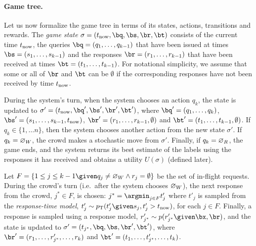 \paragraph{Game tree.}
Let us now formalize the game tree in terms of its states, actions, transitions and rewards.
The \emph{game state} $\sigma = (\now, \bq, \bs, \br, \bt)$
consists of the current time $t_\text{now}$, the queries $\bq = (q_1, \ldots, q_{k-1})$ that have been issued at times $\bs = (s_1, \ldots, s_{k-1})$ and
the responses $\br = (r_1, \ldots, r_{k-1})$ that have been received at times $\bt = (t_1, \ldots, t_{k-1})$.
For notational simplicity, we assume that some or all of $\br$ and $\bt$ can be $\emptyset$ if the corresponding responses have not been received by time $t_\text{now}$.

During the system's turn,
when the system chooses an action $q_k$,
the state is updated to $\sigma' = (\now, \bq', \bs', \br', \bt')$, where $\bq' = (q_1, \ldots, q_k)$, $\bs' = (s_1, \ldots, s_{k-1}, \now)$, $\br' = (r_1, \ldots, r_{k-1}, \emptyset)$ and $\bt' = (t_1, \ldots, t_{k-1}, \emptyset)$.
If $q_k \in \{1, \ldots n\}$, then the system chooses another action from the new state $\sigma'$.
If $q_k = \varnothing_{W}$, the crowd makes a stochastic move from $\sigma'$.
Finally, if $q_k = \varnothing_{R}$, the game ends, and the system returns its best estimate of the labels using the responses it has received and
obtains a utility $U(\sigma)$ (defined later).

Let $F = \{1 \le j \le k-1 \given q_j \neq \acwait \wedge r_j = \emptyset \}$ be the set of in-flight requests.
During the crowd's turn (i.e.\ after the system chooses $\varnothing_{W}$), the next response from the crowd, $j^* \in F$, is chosen: $j^* = \argmin_{j \in F} t'_j$ where $t'_j$ is sampled from the \emph{response-time model}, $t'_j \sim \ptime(t'_j \given s_j, t'_j > \now)$, for each $j \in F$. Finally, a response is sampled using a response model, $r'_{j^*} \sim p(r'_{j^*} \given \bx, \br)$, and the state is updated to $\sigma' = (t_{j^*}, \bq, \bs, \br', \bt')$, where $\br' = (r_1, \ldots, r'_{j^*}, \ldots, r_k)$ and $\bt' = (t_1, \ldots, t'_{j^*}, \ldots, t_k)$.

